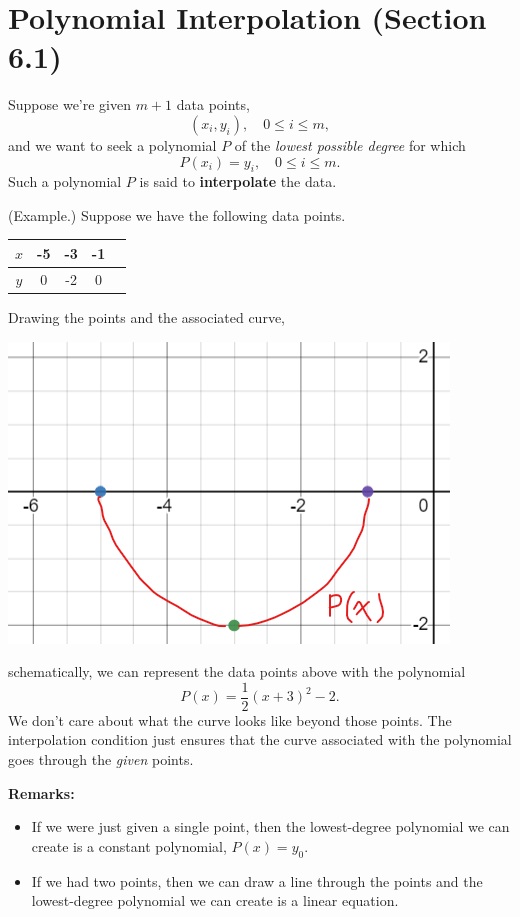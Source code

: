 \documentclass[letterpaper]{article}
\begin{document}
\section{Polynomial Interpolation (Section 6.1)}
Suppose we're given $m + 1$ data points, 
\[(x_i, y_i), \quad 0 \leq i \leq m,\]
and we want to seek a polynomial $P$ of the \emph{lowest possible degree} for which \[P(x_i) = y_i, \quad 0 \leq i \leq m.\] Such a polynomial $P$ is said to \textbf{interpolate} the data. 

\begin{mdframed}
    (Example.) Suppose we have the following data points.
    \begin{center}
        \begin{tabular}{c|c c c c}
            $x$ & -5 & -3 & -1 \\
            \hline  
            $y$ & 0 & -2 & 0
        \end{tabular}
    \end{center}
    Drawing the points and the associated curve, 
    \begin{center}
        \includegraphics[scale=0.5]{../assets/interpolation_ex1.png}
    \end{center}
    schematically, we can represent the data points above with the polynomial 
    \[P(x) = \frac{1}{2}\left(x + 3\right)^{2} - 2.\]
    We don't care about what the curve looks like beyond those points. The interpolation condition just ensures that the curve associated with the polynomial goes through the \emph{given} points. 
\end{mdframed}
\textbf{Remarks:}
\begin{itemize}
    \item If we were just given a single point, then the lowest-degree polynomial we can create is a constant polynomial, $P(x) = y_0$. 
    \item If we had two points, then we can draw a line through the points and the lowest-degree polynomial we can create is a linear equation. 
\end{itemize}
\end{document}
